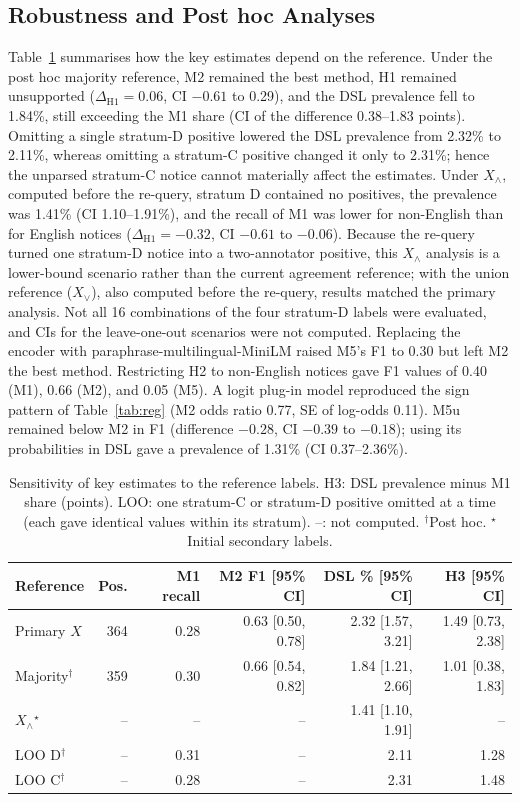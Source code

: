 \documentclass[runningheads]{llncs}
\begin{document}
\subsection{Robustness and Post hoc Analyses}
\label{sec:robust}
Table~\ref{tab:sens} summarises how the key estimates depend on the reference. Under the post hoc majority reference, M2 remained the best method, H1 remained unsupported ($\Delta_{\mathrm{H1}}=0.06$, CI $-0.61$ to 0.29), and the DSL prevalence fell to 1.84\%, still exceeding the M1 share (CI of the difference 0.38--1.83 points). Omitting a single stratum-D positive lowered the DSL prevalence from 2.32\% to 2.11\%, whereas omitting a stratum-C positive changed it only to 2.31\%; hence the unparsed stratum-C notice cannot materially affect the estimates. Under $X_\wedge$, computed before the re-query, stratum D contained no positives, the prevalence was 1.41\% (CI 1.10--1.91\%), and the recall of M1 was lower for non-English than for English notices ($\Delta_{\mathrm{H1}}=-0.32$, CI $-0.61$ to $-0.06$). Because the re-query turned one stratum-D notice into a two-annotator positive, this $X_\wedge$ analysis is a lower-bound scenario rather than the current agreement reference; with the union reference ($X_\vee$), also computed before the re-query, results matched the primary analysis. Not all 16 combinations of the four stratum-D labels were evaluated, and CIs for the leave-one-out scenarios were not computed. Replacing the encoder with paraphrase-multilingual-MiniLM raised M5's F1 to 0.30 but left M2 the best method. Restricting H2 to non-English notices gave F1 values of 0.40 (M1), 0.66 (M2), and 0.05 (M5). A logit plug-in model reproduced the sign pattern of Table~\ref{tab:reg} (M2 odds ratio 0.77, SE of log-odds 0.11). M5u remained below M2 in F1 (difference $-0.28$, CI $-0.39$ to $-0.18$); using its probabilities in DSL gave a prevalence of 1.31\% (CI 0.37--2.36\%).

\begin{table}[t]
\caption{Sensitivity of key estimates to the reference labels. H3: DSL prevalence minus M1 share (points). LOO: one stratum-C or stratum-D positive omitted at a time (each gave identical values within its stratum). --: not computed. $^\dagger$Post hoc. $^\star$Initial secondary labels.}\label{tab:sens}
\centering
\setlength{\tabcolsep}{4pt}
\begin{tabular}{lrrrrr}
\toprule
Reference & Pos. & M1 recall & M2 F1 [95\% CI] & DSL \% [95\% CI] & H3 [95\% CI] \\
\midrule
Primary $X$ & 364 & 0.28 & 0.63 [0.50, 0.78] & 2.32 [1.57, 3.21] & 1.49 [0.73, 2.38] \\
Majority$^\dagger$ & 359 & 0.30 & 0.66 [0.54, 0.82] & 1.84 [1.21, 2.66] & 1.01 [0.38, 1.83] \\
$X_\wedge$$^\star$ & -- & -- & -- & 1.41 [1.10, 1.91] & -- \\
LOO D$^\dagger$ & -- & 0.31 & -- & 2.11 & 1.28 \\
LOO C$^\dagger$ & -- & 0.28 & -- & 2.31 & 1.48 \\
\bottomrule
\end{tabular}
\end{table}
\end{document}
